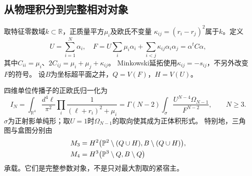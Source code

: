 \documentclass[11pt,a4paper]{ctexart}
\theoremstyle{cnplain}\newtheorem{theorem}{定理}[section]
\theoremstyle{definition}\newtheorem{definition}[theorem]{定义}
\theoremstyle{remark}\newtheorem{remark}[theorem]{注}
\begin{document}
\subsection{从物理积分到完整相对对象}
取特征零数域$k\subset\mathbb R$，正质量平方$\mu_i$及欧氏不变量
$\kappa_{ij}=(r_i-r_j)^2$属于$k$。定义
\[
 U=\sum_{i=1}^N\alpha_i,\quad
 F=U\sum_i\mu_i\alpha_i+\sum_{i<j}\kappa_{ij}\alpha_i\alpha_j
   =\alpha^t C\alpha,
\]
其中$C_{ii}=\mu_i$、$2C_{ij}=\mu_i+\mu_j+\kappa_{ij}$。
Minkowski延拓使用$\kappa_{ij}=-s_{ij}$，不另外改变$F$的符号。
设$B$为坐标超平面之并，$Q=V(F)$，$H=V(U)$。

四维单位传播子的正欧氏归一化为
\begin{equation}\label{eq:onephysical}
 I_N=\int_{\mathbb R^4}\frac{d^4\ell}{\pi^2}
           \prod_i\frac1{(\ell+r_i)^2+\mu_i}
     =\Gamma(N-2)\int_{\sigma}
        \frac{U^{N-4}\Omega_{N-1}}{F^{N-2}},\qquad N\ge3.
\end{equation}
$\sigma$为正射影单纯形；取$U=1$时$\Omega_{N-1}$的取向使其成为正体积形式。
特别地，三角图与盒图分别由
\begin{align}\label{eq:onepairs}
 M_3&=H^2\bigl(\mathbb P^2\setminus(Q\cup H),
             B\setminus(Q\cup H)\bigr),\notag\\
 M_4&=H^3\bigl(\mathbb P^3\setminus Q,B\setminus Q\bigr)
\end{align}
承载。它们是完整参数对象，不是只对最大割取的紧宿主。
\end{document}
